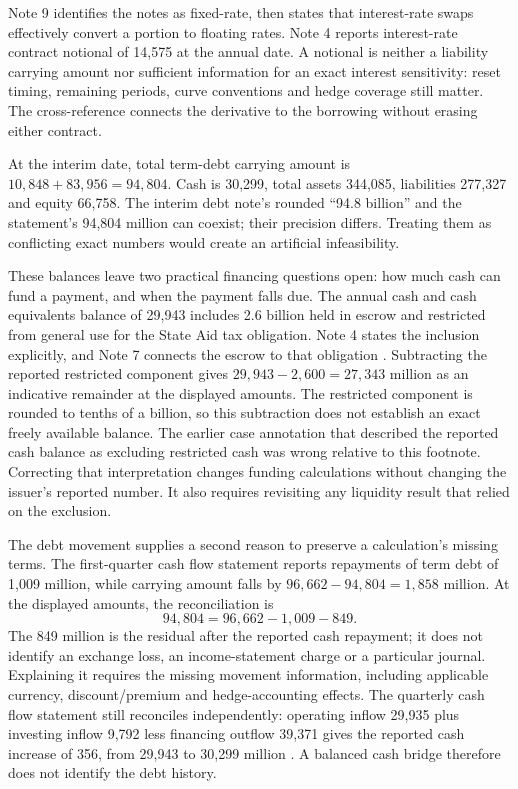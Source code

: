 Note 9 identifies the notes as fixed-rate, then states that interest-rate
swaps effectively convert a portion to floating rates. Note 4 reports
interest-rate contract notional of 14,575 at the annual date. A notional is
neither a liability carrying amount nor sufficient information for an exact
interest sensitivity: reset timing, remaining periods, curve conventions and
hedge coverage still matter. The cross-reference connects the derivative to
the borrowing without erasing either contract.

At the interim date, total term-debt carrying amount is
$10{,}848+83{,}956=94{,}804$. Cash is 30,299, total assets 344,085,
liabilities 277,327 and equity 66,758. The interim debt note's rounded
``94.8 billion'' and the statement's 94,804 million can coexist; their
precision differs. Treating them as conflicting exact numbers would create
an artificial infeasibility.

These balances leave two practical financing questions open: how much cash can
fund a payment, and when the payment falls due. The annual cash and cash
equivalents balance of 29,943 includes 2.6 billion held in escrow and restricted
from general use for the State Aid tax obligation. Note 4 states the inclusion
explicitly, and Note 7 connects the escrow to that obligation
\citep[Notes 4 and 7, printed pp.~37 and 39]{apple2024}. Subtracting the reported
restricted component gives $29{,}943-2{,}600=27{,}343$ million as an indicative
remainder at the displayed amounts. The restricted component is rounded to
tenths of a billion, so this subtraction does not establish an exact freely
available balance. The earlier case annotation that described the reported
cash balance as excluding restricted cash was wrong relative to this footnote.
Correcting that interpretation changes funding calculations without changing
the issuer's reported number. It also requires revisiting any liquidity result
that relied on the exclusion.

The debt movement supplies a second reason to preserve a calculation's missing
terms. The first-quarter cash flow statement reports repayments of term debt of
1,009 million, while carrying amount falls by
$96{,}662-94{,}804=1{,}858$ million. At the displayed amounts, the reconciliation is
\[
       94{,}804=96{,}662-1{,}009-849.
\]
The 849 million is the residual after the reported cash repayment; it does not
identify an exchange loss, an income-statement charge or a particular journal.
Explaining it requires the missing movement information, including applicable
currency, discount/premium and hedge-accounting effects. The quarterly cash
flow statement still reconciles independently: operating inflow 29,935 plus
investing inflow 9,792 less financing outflow 39,371 gives the reported cash
increase of 356, from 29,943 to 30,299 million
\citep[statement of cash flows and Note 6]{apple2025q1}. A balanced cash bridge
therefore does not identify the debt history.

